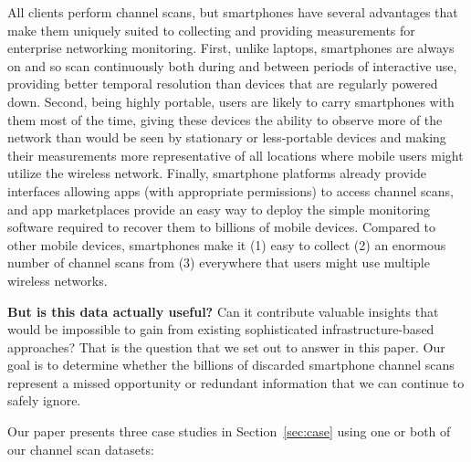 All \wifi{} clients perform channel scans, but smartphones have several
advantages that make them uniquely suited to collecting and providing
measurements for enterprise networking monitoring. First, unlike laptops,
smartphones are always on and so scan continuously both during and between
periods of interactive use, providing better temporal resolution than devices
that are regularly powered down. Second, being highly portable, users are
likely to carry smartphones with them most of the time, giving these devices
the ability to observe more of the network than would be seen by stationary
or less-portable devices and making their measurements more representative of
all locations where mobile users might utilize the wireless network. Finally,
smartphone platforms already provide interfaces allowing apps (with
appropriate permissions) to access channel scans, and app marketplaces
provide an easy way to deploy the simple monitoring software required to
recover them to billions of mobile devices. Compared to other mobile devices,
smartphones make it (1) easy to collect (2) an enormous number of channel
scans from (3) everywhere that users might use multiple wireless networks.

\textbf{But is this data actually useful?} Can it contribute valuable
insights that would be impossible to gain from existing sophisticated
infrastructure-based approaches? That is the question that we set out to
answer in this paper. Our goal is to determine whether the billions of
discarded smartphone channel scans represent a missed opportunity or
redundant information that we can continue to safely ignore.


Our paper presents three case studies in Section~\ref{sec:case} using one or
both of our channel scan datasets:

